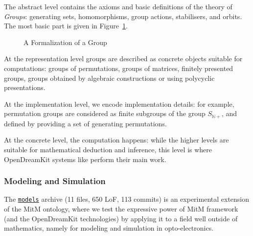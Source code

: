 The abstract level contains the axioms and basic definitions of the theory of \emph{Groups}: generating sets, homomorphisms, group actions, stabilisers, and orbits.
The most basic part is given in Figure~\ref{fig:mitm1}. 
\begin{figure}[ht]\centering
  \caption{A Formalization of a Group}\label{fig:mitm1}
\end{figure}

At the representation level groups are described as concrete objects
suitable for computations: groups of permutations, groups of matrices,
finitely presented groups, groups obtained by algebraic constructions or using
polycyclic presentations.

At the implementation level, we encode implementation details: for
example, permutation groups are considered as finite subgroups of the group $S_{\mathbb{N}+}$, and defined  by
providing a set of generating permutations.

At the concrete level, the computation happens: while the higher levels
are suitable for mathematical deduction and inference, this level is where OpenDreamKit systems like \GAP perform their main work.

\subsubsection{Modeling and Simulation}

The \href{https://gl.mathhub.info/MitM/smglom}{\texttt{models}}
archive (11 files, 650 LoF, 113 commits) is an experimental extension
of the MitM ontology, where we test the expressive power of MitM
framework (and the OpenDreamKit technologies) by applying it to a
field well outside of mathematics, namely for modeling and simulation
in opto-electronics.


